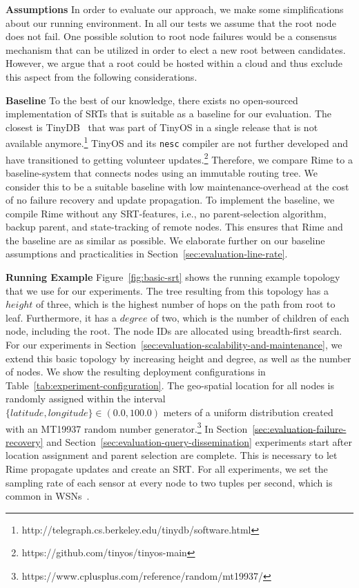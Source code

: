 \textbf{Assumptions} In order to evaluate our approach, we make some simplifications about our running environment. In all our tests we assume that the root node does not fail. 
One possible solution to root node failures would be a consensus mechanism that can be utilized in order to elect a new root between candidates. However, we argue that a root could be hosted within a cloud and thus exclude this aspect from the following considerations.

\textbf{Baseline} To the best of our knowledge, there exists no open-sourced implementation of 
SRTs that is suitable as a baseline for our evaluation. 
The closest is TinyDB~\cite{madden2005tinydb} that was part of TinyOS in a single release that is not available anymore.\footnote{http://telegraph.cs.berkeley.edu/tinydb/software.html} TinyOS and its \texttt{nesc} compiler are not further developed and have transitioned to getting volunteer updates.\footnote{https://github.com/tinyos/tinyos-main}
Therefore, we compare Rime to a baseline-system that connects nodes using an immutable routing tree.
We consider this to be a suitable baseline with low maintenance-overhead at the cost of no failure recovery and update propagation. To implement the baseline, we compile Rime without any SRT-features, i.e., no parent-selection algorithm, backup parent, and state-tracking of remote nodes. This ensures that Rime and the baseline are as similar as possible. We elaborate further on our baseline assumptions and practicalities in Section~\ref{sec:evaluation-line-rate}.

\textbf{Running Example}\label{Running Example.} Figure~\ref{fig:basic-srt} shows the 
running example topology that we use for our experiments. 
The tree resulting from this topology has a $height$ of three, which is the highest number of hops on the path from root to leaf. Furthermore, it has a $degree$ of two, which is the number of children of each node, including the root. The node IDs are allocated using breadth-first search. 
For our experiments in Section~\ref{sec:evaluation-scalability-and-maintenance}, we extend this basic topology by increasing height and degree, as well as the number of nodes. We show the resulting
deployment configurations in Table~\ref{tab:experiment-configuration}.
The geo-spatial location for all nodes is randomly assigned within the interval $\{latitude, longitude\}\in(0.0,100.0)\textrm{ meters}$ of a uniform distribution created with an MT19937 random number generator.\footnote{https://www.cplusplus.com/reference/random/mt19937/} In Section~\ref{sec:evaluation-failure-recovery} and Section~\ref{sec:evaluation-query-dissemination} experiments start after location assignment and parent selection are complete. This is necessary to let Rime propagate updates and create an SRT. 
For all experiments, we set the sampling rate of each sensor at every node to two tuples per second, which is common in WSNs~\cite{madden2005tinydb, akyildiz2002wireless}.

